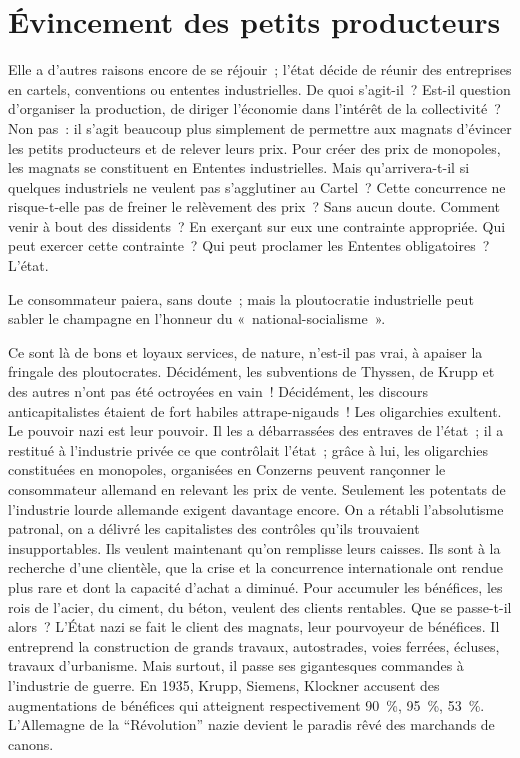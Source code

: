 \documentclass[french,twoside]{book} %
\begin{document}
\section[Évincement des petits producteurs]{Évincement des petits producteurs}
\noindent Elle a d’autres raisons encore de se réjouir ; l’état décide de réunir des entreprises en cartels, conventions ou ententes industrielles. De quoi s’agit-il ? Est-il question d’organiser la production, de diriger l’économie dans l’intérêt de la collectivité ? Non pas : il s’agit beaucoup plus simplement de permettre aux magnats d’évincer les petits producteurs et de relever leurs prix. Pour créer des prix de monopoles, les magnats se constituent en Ententes industrielles. Mais qu’arrivera-t-il si quelques industriels ne veulent pas s’agglutiner au Cartel ? Cette concurrence ne risque-t-elle pas de freiner le relèvement des prix ? Sans aucun doute. Comment venir à bout des dissidents ? En exerçant sur eux une contrainte appropriée. Qui peut exercer cette contrainte ? Qui peut proclamer les Ententes obligatoires ? L’état.\par
Le consommateur paiera, sans doute ; mais la ploutocratie industrielle peut sabler le champagne en l’honneur du « national-socialisme ».\par
Ce sont là de bons et loyaux services, de nature, n’est-il pas vrai, à apaiser la fringale des ploutocrates. Décidément, les subventions de Thyssen, de Krupp et des autres n’ont pas été octroyées en vain ! Décidément, les discours anticapitalistes étaient de fort habiles attrape-nigauds ! Les oligarchies exultent. Le pouvoir nazi est leur pouvoir. Il les a débarrassées des entraves de l’état ; il a restitué à l’industrie privée ce que contrôlait l’état ; grâce à lui, les oligarchies constituées en monopoles, organisées en Conzerns peuvent rançonner le consommateur allemand en relevant les prix de vente. Seulement les potentats de l’industrie lourde allemande exigent davantage encore. On a rétabli l’absolutisme patronal, on a délivré les capitalistes des contrôles qu’ils trouvaient insupportables. Ils veulent maintenant qu’on remplisse leurs caisses. Ils sont à la recherche d’une clientèle, que la crise et la concurrence internationale ont rendue plus rare et dont la capacité d’achat a diminué. Pour accumuler les bénéfices, les rois de l’acier, du ciment, du béton, veulent des clients rentables. Que se passe-t-il alors ? L’État nazi se fait le client des magnats, leur pourvoyeur de bénéfices. Il entreprend la construction de grands travaux, autostrades, voies ferrées, écluses, travaux d’urbanisme. Mais surtout, il passe ses gigantesques commandes à l’industrie de guerre. En 1935, Krupp, Siemens, Klockner accusent des augmentations de bénéfices qui atteignent respectivement 90 \%, 95 \%, 53 \%. L’Allemagne de la “Révolution” nazie devient le paradis rêvé des marchands de canons.
\end{document}
